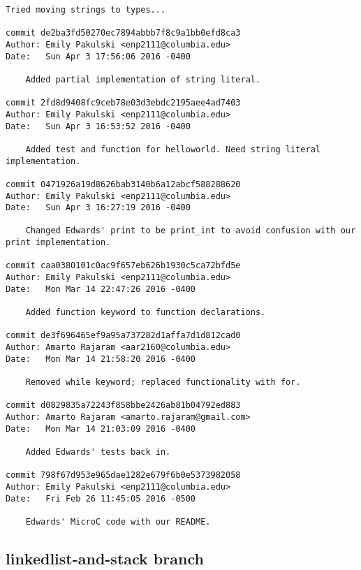 \begin{lstlisting}[backgroundcolor=\color{white}]
    Tried moving strings to types...

commit de2ba3fd50270ec7894abbb7f8c9a1bb0efd8ca3
Author: Emily Pakulski <enp2111@columbia.edu>
Date:   Sun Apr 3 17:56:06 2016 -0400

    Added partial implementation of string literal.

commit 2fd8d9408fc9ceb78e03d3ebdc2195aee4ad7403
Author: Emily Pakulski <enp2111@columbia.edu>
Date:   Sun Apr 3 16:53:52 2016 -0400

    Added test and function for helloworld. Need string literal implementation.

commit 0471926a19d8626bab3140b6a12abcf588288620
Author: Emily Pakulski <enp2111@columbia.edu>
Date:   Sun Apr 3 16:27:19 2016 -0400

    Changed Edwards' print to be print_int to avoid confusion with our print implementation.

commit caa0380101c0ac9f657eb626b1930c5ca72bfd5e
Author: Emily Pakulski <enp2111@columbia.edu>
Date:   Mon Mar 14 22:47:26 2016 -0400

    Added function keyword to function declarations.

commit de3f696465ef9a95a737282d1affa7d1d812cad0
Author: Amarto Rajaram <aar2160@columbia.edu>
Date:   Mon Mar 14 21:58:20 2016 -0400

    Removed while keyword; replaced functionality with for.

commit d0829835a72243f858bbe2426ab81b04792ed883
Author: Amarto Rajaram <amarto.rajaram@gmail.com>
Date:   Mon Mar 14 21:03:09 2016 -0400

    Added Edwards' tests back in.

commit 798f67d953e965dae1282e679f6b0e5373982058
Author: Emily Pakulski <enp2111@columbia.edu>
Date:   Fri Feb 26 11:45:05 2016 -0500

    Edwards' MicroC code with our README.

    \end{lstlisting}

\subsection{linkedlist-and-stack branch}

